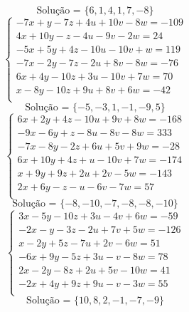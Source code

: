 \documentclass[12pt,oneside,a4paper]{article}
\begin{document}
\begin{equation*}
\text{Solução = }\{6,1,4,1,7,-8\}
\end{equation*}
\vspace{\baselineskip}
\begin{equation*}
\begin{cases}
-7x+y-7z+4u+10v-8w=-109 \\
4x+10y-z-4u-9v-2w=24 \\
-5x+5y+4z-10u-10v+w=119 \\
-7x-2y-7z-2u+8v-8w=-76 \\
6x+4y-10z+3u-10v+7w=70 \\
x-8y-10z+9u+8v+6w=-42 \\
\end{cases}
\end{equation*}
\begin{equation*}
\text{Solução = }\{-5,-3,1,-1,-9,5\}
\end{equation*}
\vspace{\baselineskip}
\begin{equation*}
\begin{cases}
6x+2y+4z-10u+9v+8w=-168 \\
-9x-6y+z-8u-8v-8w=333 \\
-7x-8y-2z+6u+5v+9w=-28 \\
6x+10y+4z+u-10v+7w=-174 \\
x+9y+9z+2u+2v-5w=-143 \\
2x+6y-z-u-6v-7w=57 \\
\end{cases}
\end{equation*}
\begin{equation*}
\text{Solução = }\{-8,-10,-7,-8,-8,-10\}
\end{equation*}
\vspace{\baselineskip}
\begin{equation*}
\begin{cases}
3x-5y-10z+3u-4v+6w=-59 \\
-2x-y-3z-2u+7v+5w=-126 \\
x-2y+5z-7u+2v-6w=51 \\
-6x+9y-5z+3u-v-8w=78 \\
2x-2y-8z+2u+5v-10w=41 \\
-2x+4y+9z+9u-v-3w=55 \\
\end{cases}
\end{equation*}
\begin{equation*}
\text{Solução = }\{10,8,2,-1,-7,-9\}
\end{equation*}
\end{document}
